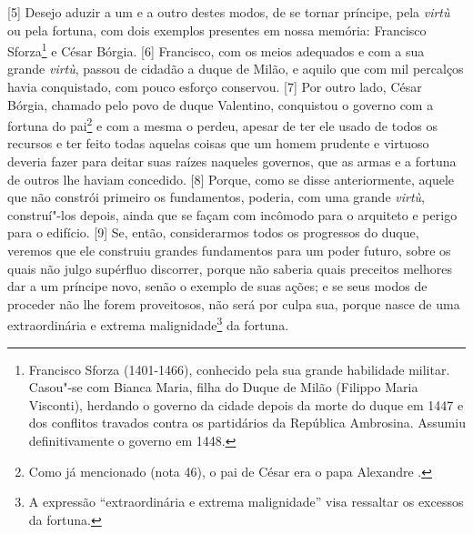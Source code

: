 {[}5{]} Desejo aduzir a um e a outro destes modos, de se tornar
príncipe, pela \emph{virtù} ou pela fortuna, com dois exemplos presentes
em nossa memória: Francisco Sforza\footnote{Francisco Sforza
  (1401-1466), conhecido pela sua grande habilidade militar. Casou"-se
  com Bianca Maria, filha do Duque de Milão (Filippo Maria Visconti), herdando o
  governo da cidade depois da morte do duque em 1447 e dos conflitos
  travados contra os partidários da República Ambrosina. Assumiu
  definitivamente o governo em 1448.} e César Bórgia. {[}6{]} Francisco,
com os meios adequados e com a sua grande \emph{virtù}, passou de
cidadão a duque de Milão, e aquilo que com mil percalços havia
conquistado, com pouco esforço conservou. {[}7{]} Por outro lado, César
Bórgia, chamado pelo povo de duque Valentino, conquistou o governo com a
fortuna do pai\footnote{Como já mencionado (nota 46), o pai de César era
  o papa Alexandre .} e com a mesma o perdeu, apesar de ter ele usado
de todos os recursos e ter feito todas aquelas coisas que um homem
prudente e virtuoso deveria fazer para deitar suas raízes naqueles
governos, que as armas e a fortuna de outros lhe haviam concedido.
{[}8{]} Porque, como se disse anteriormente, aquele que não constrói
primeiro os fundamentos, poderia, com uma grande \emph{virtù},
construí"-los depois, ainda que se façam com incômodo para o arquiteto e
perigo para o edifício. {[}9{]} Se, então, considerarmos todos os
progressos do duque, veremos que ele construiu grandes fundamentos para
um poder futuro, sobre os quais não julgo supérfluo discorrer, porque
não saberia quais preceitos melhores dar a um príncipe novo, senão o
exemplo de suas ações; e se seus modos de proceder não lhe forem
proveitosos, não será por culpa sua, porque nasce de uma extraordinária
e extrema malignidade\footnote{A expressão ``extraordinária e extrema
  malignidade'' visa ressaltar os excessos da fortuna.} da fortuna.

